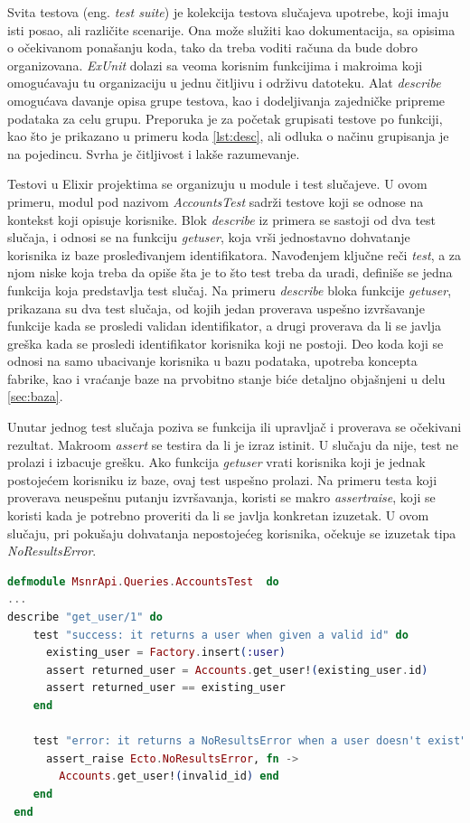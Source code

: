 \documentclass[12pt,oneside]{memoir}
\begin{document}
\par Svita testova (eng. \emph{test suite}) je kolekcija testova slučajeva upotrebe, koji imaju isti posao, ali različite scenarije. Ona može služiti kao dokumentacija, sa opisima o očekivanom ponašanju koda, tako da treba voditi računa da bude dobro organizovana. \emph{ExUnit} dolazi sa veoma korisnim funkcijima i makroima koji omogućavaju tu organizaciju u jednu čitljivu i održivu datoteku. Alat \emph{describe} omogućava davanje opisa grupe testova, kao i dodeljivanja zajedničke pripreme podataka za celu grupu. Preporuka je za početak grupisati testove po funkciji, kao što je prikazano u primeru koda \ref{lst:desc}, ali odluka o načinu grupisanja je na pojedincu. Svrha je čitljivost i lakše razumevanje. \par Testovi u Elixir projektima se organizuju u module i test slučajeve. U ovom primeru, modul pod nazivom \emph{AccountsTest} sadrži testove koji se odnose na kontekst koji opisuje korisnike. Blok \emph{describe} iz primera se sastoji od dva test slučaja, i odnosi se na funkciju \emph{get{\textunderscore}user}, koja vrši jednostavno dohvatanje korisnika iz baze prosleđivanjem identifikatora. Navođenjem ključne reči \emph{test}, a za njom niske koja treba da opiše šta je to što test treba da uradi, definiše se jedna funkcija koja predstavlja test slučaj. Na primeru \emph{describe} bloka funkcije \emph{get{\textunderscore}user}, prikazana su dva test slučaja, od kojih jedan proverava uspešno izvršavanje funkcije kada se prosledi validan identifikator, a drugi proverava da li se javlja greška kada se prosledi identifikator korisnika koji ne postoji. Deo koda koji se odnosi na samo ubacivanje korisnika u bazu podataka, upotreba koncepta fabrike, kao i vraćanje baze na prvobitno stanje biće detaljno objašnjeni u delu \ref{sec:baza}.
\par Unutar jednog test slučaja poziva se funkcija ili upravljač i proverava se očekivani rezultat. Makroom \emph{assert} se testira da li je izraz istinit. U slučaju da nije, test ne prolazi i izbacuje grešku. Ako funkcija \emph{get{\textunderscore}user} vrati korisnika koji je jednak postojećem korisniku iz baze, ovaj test uspešno prolazi. Na primeru testa koji proverava neuspešnu putanju izvršavanja, koristi se makro \emph{assert{\textunderscore}raise}, koji se koristi kada je potrebno proveriti da li se javlja konkretan izuzetak. U ovom slučaju, pri pokušaju dohvatanja nepostojećeg korisnika, očekuje se izuzetak tipa \emph{NoResultsError}.

\begin{lstlisting}[language=elixir, caption={Opisivanje testova unutar jedne grupe, na primeru funkcije za dohvatanje korisnika},captionpos=b, label={lst:desc}]
defmodule MsnrApi.Queries.AccountsTest  do
...
describe "get_user/1" do
    test "success: it returns a user when given a valid id" do
      existing_user = Factory.insert(:user)
      assert returned_user = Accounts.get_user!(existing_user.id)
      assert returned_user == existing_user
    end

    test "error: it returns a NoResultsError when a user doesn't exist" do
      assert_raise Ecto.NoResultsError, fn ->
        Accounts.get_user!(invalid_id) end
    end
 end
\end{lstlisting}
\end{document}
